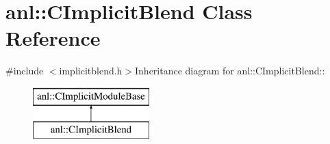\hypertarget{classanl_1_1CImplicitBlend}{
\section{anl::CImplicitBlend Class Reference}
\label{classanl_1_1CImplicitBlend}
}


{\ttfamily \#include $<$implicitblend.h$>$}Inheritance diagram for anl::CImplicitBlend::\begin{figure}[H]
\begin{center}
\leavevmode
\includegraphics[height=2cm]{classanl_1_1CImplicitBlend}
\end{center}
\end{figure}
